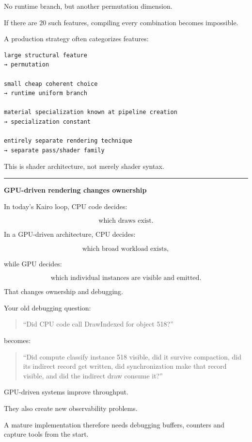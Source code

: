 No runtime branch, but another permutation dimension.

If there are 20 such features, compiling every combination becomes impossible.

A production strategy often categorizes features:

\begin{verbatim}
large structural feature
→ permutation

small cheap coherent choice
→ runtime uniform branch

material specialization known at pipeline creation
→ specialization constant

entirely separate rendering technique
→ separate pass/shader family
\end{verbatim}

This is shader architecture, not merely shader syntax.

\begin{center}\rule{0.5\linewidth}{0.5pt}\end{center}

\textbf{GPU-driven rendering changes ownership}

In today's Kairo loop, CPU code decides:

\[
\text{which draws exist}.
\]

In a GPU-driven architecture, CPU decides:

\[
\text{which broad workload exists},
\]

while GPU decides:

\[
\text{which individual instances are visible and emitted}.
\]

That changes ownership and debugging.

Your old debugging question:

\begin{quote}
``Did CPU code call DrawIndexed for object 518?''
\end{quote}

becomes:

\begin{quote}
``Did compute classify instance 518 visible, did it survive compaction, did its indirect record get written, did synchronization make that record visible, and did the indirect draw consume it?''
\end{quote}

GPU-driven systems improve throughput.

They also create new observability problems.

A mature implementation therefore needs debugging buffers, counters and capture tools from the start.

